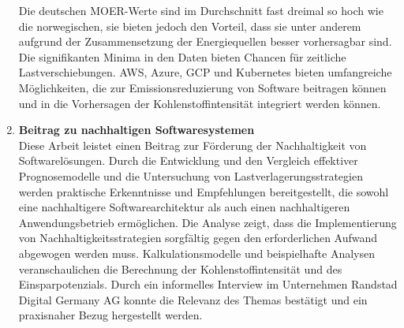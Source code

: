 \begin{enumerate}
 Die deutschen \ac{MOER}-Werte sind im Durchschnitt fast dreimal so hoch wie die norwegischen, sie bieten jedoch den Vorteil, dass sie unter anderem aufgrund der Zusammensetzung der Energiequellen besser vorhersagbar sind.
 Die signifikanten Minima in den Daten bieten Chancen für zeitliche Lastverschiebungen.
 \ac{AWS}, Azure, \ac{GCP} und Kubernetes bieten umfangreiche Möglichkeiten, die zur Emissionsreduzierung von Software beitragen können und in die Vorhersagen der Kohlenstoffintensität integriert werden können.
 \item \textbf{Beitrag zu nachhaltigen Softwaresystemen} \\
 Diese Arbeit leistet einen Beitrag zur Förderung der Nachhaltigkeit von Softwarelösungen.
 Durch die Entwicklung und den Vergleich effektiver Prognosemodelle und die Untersuchung von Lastverlagerungsstrategien werden praktische Erkenntnisse und Empfehlungen bereitgestellt, die sowohl eine nachhaltigere Softwarearchitektur als auch einen nachhaltigeren Anwendungsbetrieb ermöglichen.
 Die Analyse zeigt, dass die Implementierung von Nachhaltigkeitsstrategien sorgfältig gegen den erforderlichen Aufwand abgewogen werden muss.
 Kalkulationsmodelle und beispielhafte Analysen veranschaulichen die Berechnung der Kohlenstoffintensität und des Einsparpotenzials.
 Durch ein informelles Interview im Unternehmen Randstad Digital Germany AG konnte die Relevanz des Themas bestätigt und ein praxisnaher Bezug hergestellt werden.
\end{enumerate}
